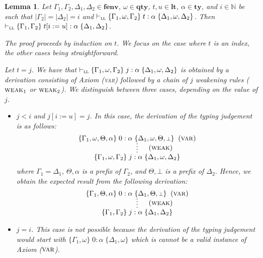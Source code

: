 \documentclass[submission,creativecommons]{eptcs}
\newtheorem{lemma}{Lemma}
\newcommand{\mybox}{\raisebox{3.5pt}{\framebox[7pt]{\rule{0mm}{0.3pt}}}}
\def\qed{\ifmmode\mybox\else{\unskip\nobreak\hfil
\penalty50\hskip1em\null\nobreak\hfil\mybox
\parfillskip=0pt\finalhyphendemerits=0\endgraf}\fi}
\newenvironment{proof}{%

\vspace{.7ex}
\noindent{\it Proof.} \rm}{\qed}
\newcommand{\bt}{{\scriptstyle\bot}}
\newcommand{\sbstt}[3]{#1[#2 := #3]}
\newcommand{\tytm}[4]{\{#1\}\;#2:#3\;\{#4\}}
\newcommand{\der}[1]{\vdash_{#1}}
\newcommand{\Sll}{{\textsc{ll}}}
\newcommand{\ltm}{\mathord{\mathbf{lt}}}
\newcommand{\ty}{\mathord{\mathbf{ty}}}
\newcommand{\qty}{\mathord{\mathbf{qty}}}
\newcommand{\fenv}{\mathord{\mathbf{fenv}}}
\begin{document}
\begin{lemma}\label{lemma:l3}
Let $\Gamma_1, \Gamma_2, \Delta_1, \Delta_2 \in \fenv$, $\omega \in \qty$, $t, u \in \ltm$, $\alpha \in \ty$,
and $i \in \mathbb{N}$ be such that
$|\Gamma_2| = |\Delta_2| = i$ and
$\der{\Sll}\tytm{\Gamma_1, \omega, \Gamma_2}{t}{\alpha}{\Delta_1, \omega, \Delta_2}$.
Then $\der{\Sll}\tytm{\Gamma_1, \Gamma_2}{\sbstt{t}{i}{u}}{\alpha}{\Delta_1, \Delta_2}$.
\begin{proof}
The proof proceeds by induction on $t$.
We focus on the case where $t$ is an index, the other cases being straightforward.

Let $t = j$. We have that $\der{\Sll}\tytm{\Gamma_1, \omega, \Gamma_2}{j}{\alpha}{\Delta_1, \omega, \Delta_2}$
is obtained by a derivation consisting of Axiom (\textsc{var}) followed by a chain of $j$ weakening rules ($\textsc{weak}_1$ or
$\textsc{weak}_2$).
We distinguish between three cases, depending on the value of $j$.

\begin{itemize}
\item $j < i$ and $\sbstt{j}{i}{u} = j$.\quad
In this case, the derivation of the typing judgement is as follows:
\begin{align*}
\infer*[\quad\mbox{(\textsc{weak})}]{
\tytm{\Gamma_1, \omega, \Gamma_2}{j}{\alpha}{\Delta_1, \omega, \Delta_2}
}{
\tytm{\Gamma_1, \omega, \Theta,\alpha}{0}{\alpha}{\Delta_1, \omega, \Theta,\bt}\;\; \mbox{(\textsc{var})}
}
\end{align*}
where $\Gamma_1=\Delta_1$, $\Theta,\alpha$ is a prefix of $\Gamma_2$, and $\Theta, \bt$ is a prefix of $\Delta_2$.
Hence, we obtain the expected result from the following derivation:
\begin{align*}
\infer*[\quad\mbox{(\textsc{weak})}]{
\tytm{\Gamma_1, \Gamma_2}{j}{\alpha}{\Delta_1, \Delta_2}
}{
\tytm{\Gamma_1, \Theta,\alpha}{0}{\alpha}{\Delta_1, \Theta,\bt}\;\; \mbox{(\textsc{var})}
}
\end{align*}

\item $j=i$.\quad
This case is not possible because the derivation of the typing judgement would start with
$\tytm{\Gamma_1, \omega}{0}{\alpha}{\Delta_1, \omega}$ which is cannot be a valid instance of Axiom ($\textsc{var}$). 


\end{itemize}
\end{proof}
\end{lemma}
\end{document}
